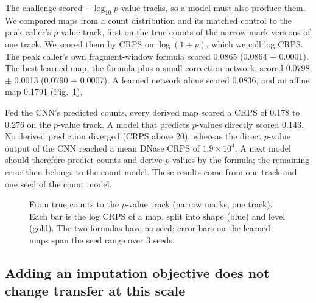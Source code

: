 \documentclass[pdflatex,sn-mathphys-num]{sn-jnl}
\newcommand{\lit}[1]{#1}
\newcommand{\pAff}{0.1791}
\newcommand{\pChainHi}{0.276}
\newcommand{\pChainLo}{0.178}
\newcommand{\pDirectDnD}{\ensuremath{1.9\times 10^{4}}}
\newcommand{\pFm}{0.0798}
\newcommand{\pFmOS}{0.0790}
\newcommand{\pFmS}{0.0013}
\newcommand{\pFmSE}{0.0007}
\newcommand{\pFrag}{0.0865}
\newcommand{\pFragOS}{0.0864}
\newcommand{\pFragSE}{0.0001}
\newcommand{\pMlp}{0.0836}
\newcommand{\pOldD}{0.143}
\begin{document}
The challenge scored $-\log_{\lit{10}} p$-value tracks, so a model must also produce them. We
compared maps from a count distribution and its matched control to the peak caller's $p$-value
track, first on the true counts of the narrow-mark versions of one track. We scored them by
CRPS on $\log(\lit{1}+p)$, which we call log CRPS. The peak caller's own fragment-window formula
scored \pFrag{} (\pFragOS{} + \pFragSE{}). The best learned map, the formula plus a small
correction network, scored \pFm{} $\pm$ \pFmS{} (\pFmOS{} + \pFmSE{}). A learned network alone
scored \pMlp{}, and an affine map \pAff{} (Fig.~\ref{fig:pmap}).

Fed the CNN's predicted counts, every derived map scored a CRPS of \pChainLo{} to \pChainHi{} on
the $p$-value track. A model that predicts $p$-values directly scored \pOldD{}. No derived
prediction diverged (CRPS above \lit{20}), whereas the direct $p$-value output of the CNN
reached a mean DNase CRPS of \pDirectDnD{}. A next model should therefore predict counts and
derive $p$-values by the formula; the remaining error then belongs to the count model. These
results come from one track and one seed of the count model.

\begin{figure}[t]
\centering
{}
\caption{From true counts to the $p$-value track (narrow marks, one track). Each bar is the
log CRPS of a map, split into shape (blue) and level (gold). The two formulas have no seed;
error bars on the learned maps span the seed range over \lit{3} seeds.}\label{fig:pmap}
\end{figure}

\subsection{Adding an imputation objective does not change transfer at this scale}\label{sec:r10}
\end{document}
